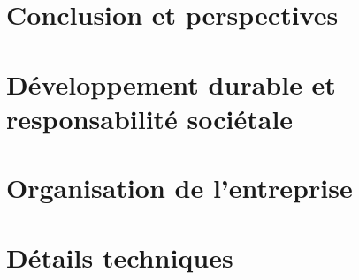 \documentclass[language=fr, year=1A, enterprise=ensIIE]{ensiie-report}
\begin{document}
% 


\section{Conclusion et perspectives}\label{sec:conclusion}


\newpage


\appendix
\section{Développement durable et responsabilité sociétale}\label{sec:ddrs}


\newpage


\section{Organisation de l'entreprise}\label{sec:organisation}


\newpage


\section{Détails techniques}\label{sec:details_techniques}


\newpage


\renewcommand{\refname}{Références}
\label{sec:references}

\newpage

\end{document}

